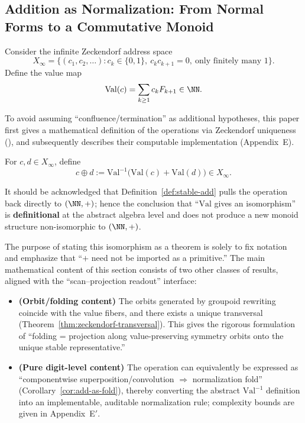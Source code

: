 \subsection{Addition as Normalization: From Normal Forms to a Commutative Monoid}\label{subsec:emergent-arithmetic-stable-add}

Consider the infinite Zeckendorf address space
\[
X_\infty=\{(c_1,c_2,\dots): c_k\in\{0,1\},\ c_kc_{k+1}=0,\ \text{only finitely many }1\}.
\]
Define the value map
\[
\mathrm{Val}(c)=\sum_{k\ge1}c_kF_{k+1}\in\NN.
\]

To avoid assuming ``confluence/termination'' as additional hypotheses, this paper first gives a mathematical definition of the operations via Zeckendorf uniqueness (\cite{Zeckendorf1972}), and subsequently describes their computable implementation (Appendix~E).

\begin{definition}\label{def:stable-add}
For $c,d\in X_\infty$, define
\[
c\oplus d:=\mathrm{Val}^{-1}\bigl(\mathrm{Val}(c)+\mathrm{Val}(d)\bigr)\in X_\infty.
\]
\end{definition}

\begin{remark}\label{rem:arith-not-novel-as-abstract}
It should be acknowledged that Definition~\ref{def:stable-add} pulls the operation back directly to $(\NN,+)$; hence the conclusion that ``\(\mathrm{Val}\) gives an isomorphism'' is \textbf{definitional} at the abstract algebra level and does not produce a new monoid structure non-isomorphic to \((\NN,+)\).

The purpose of stating this isomorphism as a theorem is solely to fix notation and emphasize that ``$+$ need not be imported as a primitive.'' The main mathematical content of this section consists of two other classes of results, aligned with the ``scan--projection readout'' interface:
\begin{itemize}
  \item \textbf{(Orbit/folding content)} The orbits generated by groupoid rewriting coincide with the value fibers, and there exists a unique transversal (Theorem~\ref{thm:zeckendorf-transversal}). This gives the rigorous formulation of ``folding = projection along value-preserving symmetry orbits onto the unique stable representative.''
  \item \textbf{(Pure digit-level content)} The operation can equivalently be expressed as ``componentwise superposition/convolution $\Rightarrow$ normalization fold'' (Corollary~\ref{cor:add-as-fold}), thereby converting the abstract \(\mathrm{Val}^{-1}\) definition into an implementable, auditable normalization rule; complexity bounds are given in Appendix~E$'$.
\end{itemize}
\end{remark}

